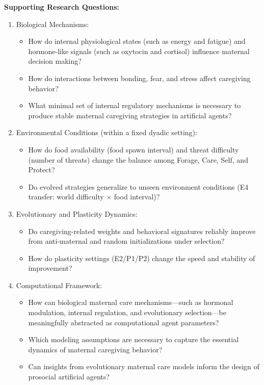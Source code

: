 \noindent\textbf{Supporting Research Questions:}

\begin{enumerate}

\item Biological Mechanisms:
\begin{itemize}
\item How do internal physiological states (such as energy and fatigue) and hormone-like signals (such as oxytocin and cortisol) influence maternal decision making?
\item How do interactions between bonding, fear, and stress affect caregiving behavior?
\item What minimal set of internal regulatory mechanisms is necessary to produce stable maternal caregiving strategies in artificial agents?
\end{itemize}

\item Environmental Conditions (within a fixed dyadic setting):
\begin{itemize}
\item How do food availability (food spawn interval) and threat difficulty (number of threats) change the balance among Forage, Care, Self, and Protect?
\item Do evolved strategies generalize to unseen environment conditions (E4 transfer: world difficulty $\times$ food interval)?
\end{itemize}

\item Evolutionary and Plasticity Dynamics:
\begin{itemize}
\item Do caregiving-related weights and behavioral signatures reliably improve from anti-maternal and random initializations under selection?
\item How do plasticity settings (E2/P1/P2) change the speed and stability of improvement?
\end{itemize}

\item Computational Framework:
\begin{itemize}
\item How can biological maternal care mechanisms—such as hormonal modulation, internal regulation, and evolutionary selection—be meaningfully abstracted as computational agent parameters?
\item Which modeling assumptions are necessary to capture the essential dynamics of maternal caregiving behavior?
\item Can insights from evolutionary maternal care models inform the design of prosocial artificial agents?
\end{itemize}

\end{enumerate}



